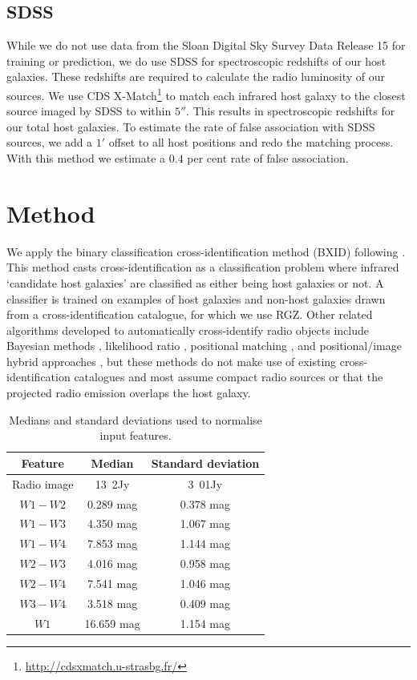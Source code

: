     \subsection{SDSS} \label{sec:sdss-data}

    While we do not use data from the Sloan Digital Sky Survey Data Release 15 \citep[SDSS;][]{sdss} for training or prediction, we do use SDSS for spectroscopic redshifts of our host galaxies. These redshifts are required to calculate the radio luminosity of our sources. We use CDS X-Match\footnote{\url{http://cdsxmatch.u-strasbg.fr/}} to match each infrared host galaxy to the closest source imaged by SDSS to within $5''$. This results in \nsourceszsp{} spectroscopic redshifts for our \nsources{} total host galaxies. To estimate the rate of false association with SDSS sources, we add a $1'$ offset to all host positions and redo the matching process. With this method we estimate a $0.4$ per cent rate of false association.

\section{Method}\label{sec:method}
    
We apply the binary classification cross-identification method (BXID) following \citet{alger18radio}. This method casts cross-identification
as a classification problem where infrared `candidate host galaxies' are
classified as either being host galaxies or not. A classifier is trained
on examples of host galaxies and non-host galaxies drawn from a
cross-identification catalogue, for which we use RGZ. Other related
algorithms developed to automatically cross-identify radio objects
include Bayesian methods \citep{fan15}, likelihood ratio \citep{weston18lrpy},
 positional matching \citep[e.g.][]{kimball08, norris06, middelberg08}, and positional/image hybrid approaches \citep{vanvelzen12radio}, but these methods do not make use of existing
cross-identification catalogues and most assume compact radio sources or that the projected radio emission overlaps the host galaxy.

\begin{table}
  \caption{Medians and standard deviations used to normalise input features.
    \label{tab:medians-stdevs}}
    \centering
  \begin{tabular}{ccc}
    \hline
    Feature & Median & Standard deviation\\
    \hline
    Radio image & \unit{13.2}{\micro{}Jy} & \unit{3.01}{\milli{}Jy}\\
    $W1 - W2$ & 0.289 mag & 0.378 mag\\
    $W1 - W3$ & 4.350 mag & 1.067 mag\\
    $W1 - W4$ & 7.853 mag & 1.144 mag\\
    $W2 - W3$ & 4.016 mag & 0.958 mag\\
    $W2 - W4$ & 7.541 mag & 1.046 mag\\
    $W3 - W4$ & 3.518 mag & 0.409 mag\\
    $W1$ & 16.659 mag & 1.154 mag\\
    \hline
  \end{tabular}
\end{table}

